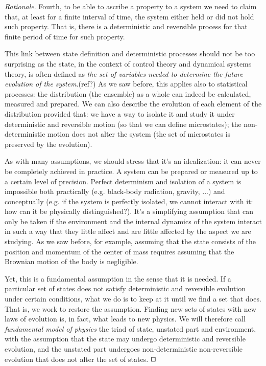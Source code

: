 \documentclass[smallextended]{svjour3}
\numberwithin{equation}{section}
\newenvironment{rationale}{\emph{Rationale}.}{\hfill\(\qed\)}
\begin{document}
\begin{rationale}
Fourth, to be able to ascribe a property to a system we need to claim that, at least for a finite interval of time, the system either held or did not hold such property. That is, there is a deterministic and reversible process for that finite period of time for such property.

This link between state definition and deterministic processes should not be too surprising as the state, in the context of control theory and dynamical systems theory, is often defined as \emph{the set of variables needed to determine the future evolution of the system}.(ref?) As we saw before, this applies also to statistical processes: the distribution (the ensemble) as a whole can indeed be calculated, measured and prepared. We can also describe the evolution of each element of the distribution provided that: we have a way to isolate it and study it under deterministic and reversible motion (so that we can define microstates); the non-deterministic motion does not alter the system (the set of microstates is preserved by the evolution).

As with many assumptions, we should stress that it's an idealization: it can never be completely achieved in practice. A system can be prepared or measured up to a certain level of precision. Perfect determinism and isolation of a system is impossible both practically (e.g. black-body radiation, gravity, ...) and conceptually (e.g. if the system is perfectly isolated, we cannot interact with it: how can it be physically distinguished?). It's a simplifying assumption that can only be taken if the environment and the internal dynamics of the system interact in such a way that they little affect and are little affected by the aspect we are studying. As we saw before, for example, assuming that the state consists of the position and momentum of the center of mass requires assuming that the Brownian motion of the body is negligible.

Yet, this is a fundamental assumption in the sense that it is needed. If a particular set of states does not satisfy deterministic and reversible evolution under certain conditions, what we do is to keep at it until we find a set that does. That is, we work to restore the assumption. Finding new sets of states with new laws of evolution is, in fact, what leads to new physics. We will therefore call \emph{fundamental model of physics} the triad of state, unstated part and environment, with the assumption that the state may undergo deterministic and reversible evolution, and the unstated part undergoes non-deterministic non-reversible evolution that does not alter the set of states.
\end{rationale}
\end{document}
